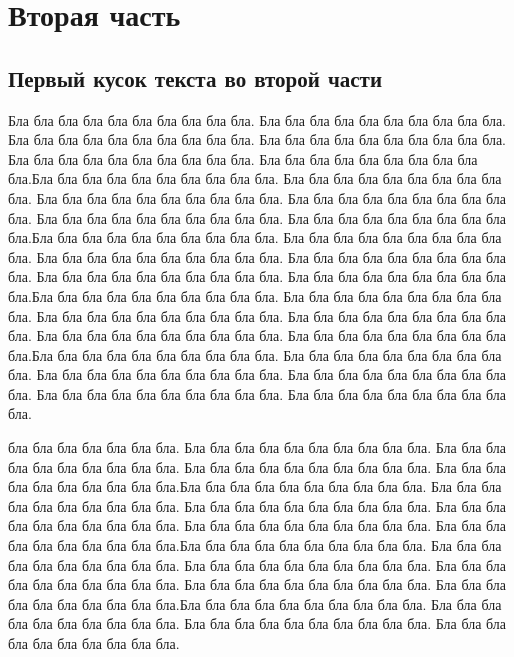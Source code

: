 \documentclass[12pt, a4paper]{article}
\begin{document}
\section{Вторая часть}
\subsection{Первый кусок текста во второй части}

\thispagestyle{empty}

Бла бла бла бла бла бла бла бла бла бла. Бла бла бла бла бла бла бла бла бла бла. Бла бла бла бла бла бла бла бла бла бла. Бла бла бла бла бла бла бла бла бла бла. Бла бла бла бла бла бла бла бла бла бла. Бла бла бла бла бла бла бла бла бла бла.Бла бла бла бла бла бла бла бла бла бла. Бла бла бла бла бла бла бла бла бла бла. Бла бла бла бла бла бла бла бла бла бла. Бла бла бла бла бла бла бла бла бла бла. Бла бла бла бла бла бла бла бла бла бла. Бла бла бла бла бла бла бла бла бла бла.Бла бла бла бла бла бла бла бла бла бла. Бла бла бла бла бла бла бла бла бла бла. Бла бла бла бла бла бла бла бла бла бла. Бла бла бла бла бла бла бла бла бла бла. Бла бла бла бла бла бла бла бла бла бла. Бла бла бла бла бла бла бла бла бла бла.Бла бла бла бла бла бла бла бла бла бла. Бла бла бла бла бла бла бла бла бла бла. Бла бла бла бла бла бла бла бла бла бла. Бла бла бла бла бла бла бла бла бла бла. Бла бла бла бла бла бла бла бла бла бла. Бла бла бла бла бла бла бла бла бла бла.Бла бла бла бла бла бла бла бла бла бла. Бла бла бла бла бла бла бла бла бла бла. Бла бла бла бла бла бла бла бла бла бла. Бла бла бла бла бла бла бла бла бла бла. Бла бла бла бла бла бла бла бла бла бла. Бла бла бла бла бла бла бла бла бла бла.

бла бла бла бла бла бла бла. Бла бла бла бла бла бла бла бла бла бла. Бла бла бла бла бла бла бла бла бла бла. Бла бла бла бла бла бла бла бла бла бла. Бла бла бла бла бла бла бла бла бла бла.Бла бла бла бла бла бла бла бла бла бла. Бла бла бла бла бла бла бла бла бла бла. Бла бла бла бла бла бла бла бла бла бла. Бла бла бла бла бла бла бла бла бла бла. Бла бла бла бла бла бла бла бла бла бла. Бла бла бла бла бла бла бла бла бла бла.Бла бла бла бла бла бла бла бла бла бла. Бла бла бла бла бла бла бла бла бла бла. Бла бла бла бла бла бла бла бла бла бла. Бла бла бла бла бла бла бла бла бла бла. Бла бла бла бла бла бла бла бла бла бла. Бла бла бла бла бла бла бла бла бла бла.Бла бла бла бла бла бла бла бла бла бла. Бла бла бла бла бла бла бла бла бла бла. Бла бла бла бла бла бла бла бла бла бла. Бла бла бла бла бла бла бла бла бла бла.
\end{document}
